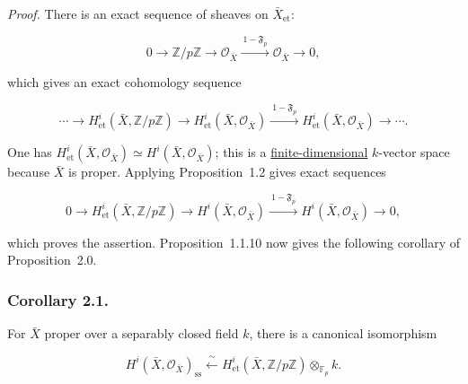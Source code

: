 \medskip
\noindent\emph{Proof.}
There is an exact sequence of sheaves on $\bar X_{\mathrm{et}}$:

\begin{equation}\tag{2.0.4}
0\longrightarrow\mathbb Z/p\mathbb Z\longrightarrow\mathcal O_{\bar X}
\xrightarrow{\ 1-\mathfrak F_p\ }\mathcal O_{\bar X}\longrightarrow0,
\end{equation}

which gives an exact cohomology sequence

\begin{equation}\tag{2.0.5}
\cdots\longrightarrow H^i_{\mathrm{et}}(\bar X,\mathbb Z/p\mathbb Z)
\longrightarrow H^i_{\mathrm{et}}(\bar X,\mathcal O_{\bar X})
\xrightarrow{\ 1-\mathfrak F_p\ }
H^i_{\mathrm{et}}(\bar X,\mathcal O_{\bar X})\longrightarrow\cdots .
\end{equation}

One has
$H^i_{\mathrm{et}}(\bar X,\mathcal O_{\bar X})\simeq
H^i(\bar X,\mathcal O_{\bar X})$; this is a \underline{finite-dimensional}
$k$-vector space because $\bar X$ is proper. Applying Proposition~1.2 gives
exact sequences

\begin{equation}\tag{2.0.6}
0\longrightarrow H^i_{\mathrm{et}}(\bar X,\mathbb Z/p\mathbb Z)
\longrightarrow H^i(\bar X,\mathcal O_{\bar X})
\xrightarrow{\ 1-\mathfrak F_p\ }
H^i(\bar X,\mathcal O_{\bar X})\longrightarrow0,
\end{equation}

which proves the assertion. Proposition~1.1.10 now gives the following
corollary of Proposition~2.0.

\subsubsection*{Corollary 2.1.}
For $\bar X$ proper over a separably closed field $k$, there is a canonical
isomorphism

\begin{equation}\tag{2.1.1}
H^i(\bar X,\mathcal O_{\bar X})_{\mathrm{ss}}
\xleftarrow{\ \sim\ }
H^i_{\mathrm{et}}(\bar X,\mathbb Z/p\mathbb Z)
\otimes_{\mathbb F_p}k.
\end{equation}
